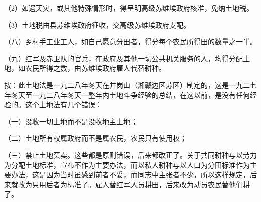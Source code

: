 （2）如遇天灾，或其他特殊情形时，得呈明高级苏维埃政府核准，免纳土地税。

（3）土地税由县苏维埃政府征收，交高级苏维埃政府支配。

（八）乡村手工业工人，如自己愿意分田者，得分每个农民所得田的数量之一半。

（九）红军及赤卫队的官兵，在政府及其他一切公共机关服务的人，均得分配土地，如农民所得之数，由苏维埃政府雇人代替耕种。

按：此土地法是一九二八年冬天在井岗山（湘赣边区苏区）制定的，这是一九二七年冬天至一九二八年冬天一整年内土地斗争经验的总结，在这以前，是没有任何经验的。这个土地法有几个错误：

（一）没收一切土地而不是没牧地主土地；

（二）土地所有权属政府而不是属农民，农民只有使用权；

（三）禁止土地买卖。这些都是原则错误，后来都改正了。关于共同耕种与以劳力为分配土地标准，宣布不作为主要办法，而以私人耕种与以人口为分田标准作为主要办法，这是因为当时虽感到前者不妥，而同志中主张者不少，所以这样规定，后来就改为只用后者为标准了。雇人替红军人员耕田，后来改为动员农民替他们耕了。


